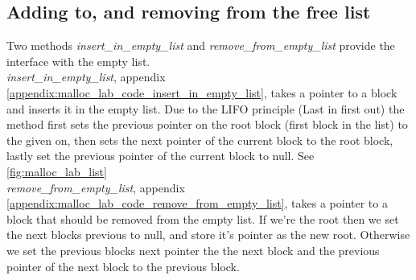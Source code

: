 \documentclass[11pt]{report}
\begin{document}
\subsection{Adding to, and removing from the free list}
Two methods \textit{insert\_in\_empty\_list} and \textit{remove\_from\_empty\_list} provide the interface with the empty list.\\[1ex]

\textit{insert\_in\_empty\_list}, appendix \ref{appendix:malloc_lab_code_insert_in_empty_list}, takes a pointer to a block and inserts it in the empty list. Due to the LIFO principle (Last in first out) the method first sets the previous pointer on the root block (first block in the list) to the given on, then sets the next pointer of the current block to the root block, lastly set the previous pointer of the current block to null. See \ref{fig:malloc_lab_list}\\[1ex]

\textit{remove\_from\_empty\_list}, appendix \ref{appendix:malloc_lab_code_remove_from_empty_list}, takes a pointer to a block that should be removed from the empty list. If we're the root then we set the next blocks previous to null, and store it's pointer as the new root. Otherwise we set the previous blocks next pointer the the next block and the previous pointer of the next block to the previous block.\\[1ex]
\end{document}
